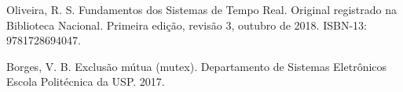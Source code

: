 \documentclass[journal]{IEEEtran}
\begin{document}

\ifCLASSOPTIONcaptionsoff
  \newpage
\fi

\begin{thebibliography}{1}

Oliveira, R. S. Fundamentos dos Sistemas de Tempo Real. Original registrado na Biblioteca Nacional. Primeira edição, revisão 3, outubro de 2018. ISBN-13: 9781728694047.

Borges, V. B. Exclusão mútua (mutex). Departamento de Sistemas Eletrônicos Escola Politécnica da USP. 2017.

\end{thebibliography}

\end{document}
